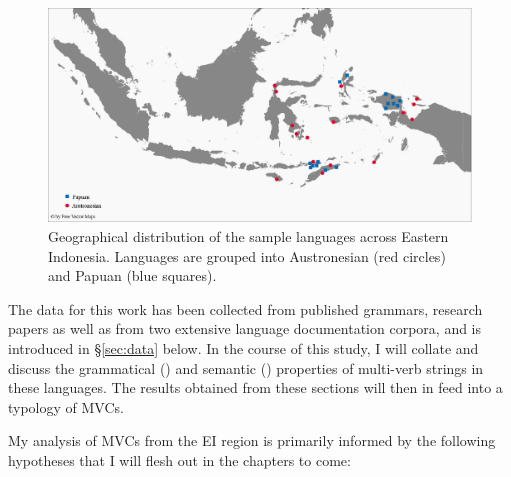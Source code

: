 \begin{figure}
\includegraphics[width=\columnwidth]{figures/Map_overview_klein.eps}
\caption[Geographical distribution of sample languages]{Geographical distribution of the sample languages across Eastern Indonesia. Languages are grouped into Austronesian (red circles) and Papuan (blue squares).}\label{map:overview}
\end{figure}

The data for this work has been collected from published grammars, research papers as well as from two extensive language documentation corpora, and is introduced in §\ref{sec:data} below. In the course of this study, I will collate and discuss the grammatical () and semantic () properties of multi-verb strings in these languages. The results obtained from these sections will then in  feed into a typology of MVCs. 

My analysis of MVCs from the EI region is primarily informed by the following hypotheses that I will flesh out in the chapters to come:

